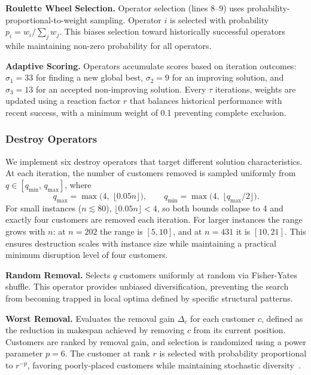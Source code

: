\documentclass{article}
\begin{document}
\textbf{Roulette Wheel Selection.} Operator selection (lines 8--9) uses probability-proportional-to-weight sampling. Operator $i$ is selected with probability $p_i = w_i / \sum_j w_j$. This biases selection toward historically successful operators while maintaining non-zero probability for all operators.

\textbf{Adaptive Scoring.} Operators accumulate scores based on iteration outcomes: $\sigma_1 = 33$ for finding a new global best, $\sigma_2 = 9$ for an improving solution, and $\sigma_3 = 13$ for an accepted non-improving solution. Every $\tau$ iterations, weights are updated using a reaction factor $r$ that balances historical performance with recent success, with a minimum weight of 0.1 preventing complete exclusion.

\subsubsection{Destroy Operators}

We implement six destroy operators that target different solution characteristics. At each iteration, the number of customers removed is sampled uniformly from $q \in [q_{\min},\, q_{\max}]$, where
\[
q_{\max} = \max\!\bigl(4,\; \lfloor 0.05n \rfloor\bigr), \qquad
q_{\min} = \max\!\bigl(4,\; \lfloor q_{\max}/2 \rfloor\bigr).
\]
For small instances ($n \lesssim 80$), $\lfloor 0.05n \rfloor < 4$, so both bounds collapse to 4 and exactly four customers are removed each iteration. For larger instances the range grows with $n$: at $n = 202$ the range is $[5, 10]$, and at $n = 431$ it is $[10, 21]$. This ensures destruction scales with instance size while maintaining a practical minimum disruption level of four customers.

\textbf{Random Removal.} Selects $q$ customers uniformly at random via Fisher-Yates shuffle. This operator provides unbiased diversification, preventing the search from becoming trapped in local optima defined by specific structural patterns.

\textbf{Worst Removal.} Evaluates the removal gain $\Delta_c$ for each customer $c$, defined as the reduction in makespan achieved by removing $c$ from its current position. Customers are ranked by removal gain, and selection is randomized using a power parameter $p = 6$. The customer at rank $r$ is selected with probability proportional to $r^{-p}$, favoring poorly-placed customers while maintaining stochastic diversity~\cite{ropke2006adaptive}.
\end{document}
